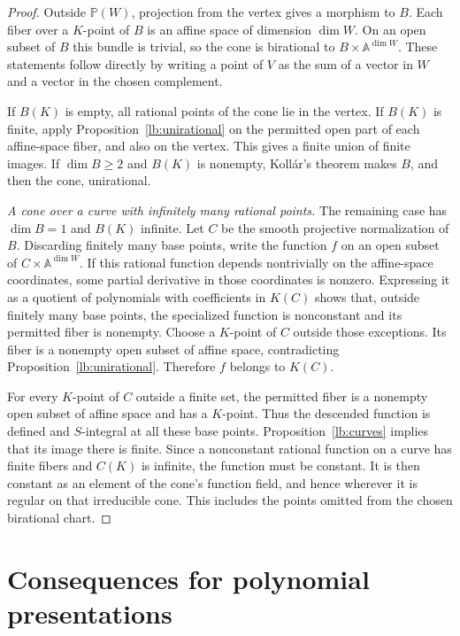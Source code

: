 \documentclass[11pt,a4paper]{article}
\theoremstyle{definition}
\newcommand{\A}{\mathbb A}
\newcommand{\PP}{\mathbb P}
\begin{document}
\begin{proof}
Outside $\PP(W)$, projection from the vertex gives a morphism
to $B$. Each fiber over a $K$-point of $B$ is an affine space of
dimension $\dim W$. On an open subset of $B$ this bundle is
trivial, so the cone is birational to $B\times\A^{\dim W}$.
These statements follow directly by writing a point of $V$ as
the sum of a vector in $W$ and a vector in the chosen complement.

If $B(K)$ is empty, all rational points of the cone lie in the
vertex. If $B(K)$ is finite, apply Proposition~\ref{lb:unirational}
on the permitted open part of each affine-space fiber, and also
on the vertex. This gives a finite union of finite images.
If $\dim B\ge2$ and $B(K)$ is nonempty, Koll\'ar's theorem
makes $B$, and then the cone, unirational.

\emph{A cone over a curve with infinitely many rational points.}
The remaining case has $\dim B=1$ and $B(K)$ infinite. Let $C$
be the smooth projective normalization of $B$. Discarding finitely
many base points, write the function $f$ on an open subset of
$C\times\A^{\dim W}$. If this rational function depends
nontrivially on the affine-space coordinates, some partial
derivative in those coordinates is nonzero. Expressing it as a
quotient of polynomials with coefficients in $K(C)$ shows that,
outside finitely many base points, the specialized function is
nonconstant and its permitted fiber is nonempty. Choose a
$K$-point of $C$ outside those exceptions. Its fiber is a
nonempty open subset of affine space, contradicting
Proposition~\ref{lb:unirational}. Therefore $f$ belongs to $K(C)$.

For every $K$-point of $C$ outside a finite set, the permitted
fiber is a nonempty open subset of affine space and has a $K$-point.
Thus the descended function is defined and $S$-integral at all
these base points. Proposition~\ref{lb:curves} implies that its
image there is finite. Since a nonconstant rational function on
a curve has finite fibers and $C(K)$ is infinite, the function
must be constant. It is then constant as an element of the
cone's function field, and hence wherever it is regular on that
irreducible cone. This includes the points omitted from the
chosen birational chart.
\end{proof}

\section{Consequences for polynomial presentations}
\end{document}
